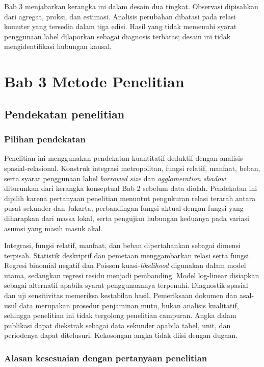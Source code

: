 \documentclass[12pt,a4paper,oneside,openany,indonesian]{report}
\begin{document}
Bab 3 menjabarkan kerangka ini dalam desain dua tingkat. Observasi dipisahkan dari agregat, proksi, dan estimasi. Analisis perubahan dibatasi pada relasi komuter yang tersedia dalam tiga edisi. Hasil yang tidak memenuhi syarat penggunaan label dilaporkan sebagai diagnosis terbatas; desain ini tidak mengidentifikasi hubungan kausal.

\clearpage

\chapter{Bab 3 Metode Penelitian}
\section{Pendekatan penelitian}\label{pendekatan-penelitian}

\subsection{Pilihan pendekatan}\label{pilihan-pendekatan}

Penelitian ini menggunakan pendekatan kuantitatif deduktif dengan
analisis spasial-relasional. Konstruk integrasi metropolitan,
fungsi relatif, manfaat, beban, serta syarat penggunaan label
\emph{borrowed size} dan \emph{agglomeration shadow} diturunkan dari
kerangka konseptual Bab 2 sebelum data diolah. Pendekatan ini
dipilih karena pertanyaan penelitian menuntut pengukuran relasi
terarah antara pusat sekunder dan Jakarta, perbandingan fungsi aktual
dengan fungsi yang diharapkan dari massa lokal, serta pengujian
hubungan keduanya pada variasi asumsi yang masih masuk akal.

Integrasi, fungsi relatif, manfaat, dan beban dipertahankan sebagai
dimensi terpisah. Statistik deskriptif dan pemetaan menggambarkan
relasi serta fungsi. Regresi binomial negatif dan Poisson
kuasi-\emph{likelihood} digunakan dalam model utama, sedangkan regresi
residu menjadi pembanding. Model log-linear disiapkan sebagai
alternatif apabila syarat penggunaannya terpenuhi. Diagnostik spasial
dan uji sensitivitas memeriksa kestabilan hasil. Pemeriksaan
dokumen dan asal-usul data merupakan prosedur penjaminan mutu, bukan
analisis kualitatif, sehingga penelitian ini tidak tergolong penelitian
campuran. Angka dalam publikasi dapat diekstrak sebagai data sekunder
apabila tabel, unit, dan periodenya dapat ditelusuri. Kekosongan angka
tidak diisi dengan dugaan.

\subsection{Alasan kesesuaian dengan pertanyaan
penelitian}\label{alasan-kesesuaian-dengan-pertanyaan-penelitian}
\end{document}

